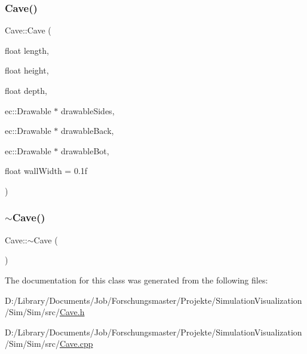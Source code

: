 \subsubsection{\texorpdfstring{Cave()}{Cave()}}
{\footnotesize\ttfamily Cave\+::\+Cave (\begin{DoxyParamCaption}\item[{float}]{length,  }\item[{float}]{height,  }\item[{float}]{depth,  }\item[{ec\+::\+Drawable $\ast$}]{drawable\+Sides,  }\item[{ec\+::\+Drawable $\ast$}]{drawable\+Back,  }\item[{ec\+::\+Drawable $\ast$}]{drawable\+Bot,  }\item[{float}]{wall\+Width = {\ttfamily 0.1f} }\end{DoxyParamCaption})\hspace{0.3cm}{\ttfamily [explicit]}}

\mbox{\label{class_cave_a0cba575d8166ade9308b75b5c05bd730}} 
\subsubsection{\texorpdfstring{$\sim$\+Cave()}{~Cave()}}
{\footnotesize\ttfamily Cave\+::$\sim$\+Cave (\begin{DoxyParamCaption}{ }\end{DoxyParamCaption})\hspace{0.3cm}{\ttfamily [default]}}



The documentation for this class was generated from the following files\+:\begin{DoxyCompactItemize}
\item 
D\+:/\+Library/\+Documents/\+Job/\+Forschungsmaster/\+Projekte/\+Simulation\+Visualization/\+Sim/\+Sim/src/\mbox{\hyperlink{_cave_8h}{Cave.\+h}}\item 
D\+:/\+Library/\+Documents/\+Job/\+Forschungsmaster/\+Projekte/\+Simulation\+Visualization/\+Sim/\+Sim/src/\mbox{\hyperlink{_cave_8cpp}{Cave.\+cpp}}\end{DoxyCompactItemize}
